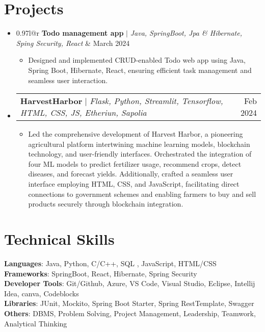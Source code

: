 \documentclass[letterpaper,11pt]{article}
\makeatletter
\newcommand{\resumeItem}[1]{
  \item\small{
    {#1 \vspace{-2pt}}
  }
}
\newcommand{\resumeSubSubheading}[2]{
    \item
    \begin{tabular*}{0.97\textwidth}{l@{\extracolsep{\fill}}r}
      \textit{\small#1} & \textit{\small #2} \\
    \end{tabular*}\vspace{-7pt}
}
\newcommand{\resumeProjectHeading}[2]{
    \item
    \begin{tabular*}{0.97\textwidth}{l@{\extracolsep{\fill}}r}
      \small#1 & #2 \\
    \end{tabular*}\vspace{-7pt}
}
\newcommand{\resumeSubHeadingListStart}{\begin{itemize}[leftmargin=0.15in, label={}]}
\newcommand{\resumeSubHeadingListEnd}{\end{itemize}}
\newcommand{\resumeItemListStart}{\begin{itemize}}
\newcommand{\resumeItemListEnd}{\end{itemize}\vspace{-5pt}}
\makeatother
\begin{document}

\section{Projects}
    \resumeSubHeadingListStart
            \resumeProjectHeading
          {\textbf{Todo management app} $|$ \emph{Java, SpringBoot, Jpa & Hibernate, Sping Security, React}}{March 2024 }
          \resumeItemListStart
            \resumeItem{Designed and implemented CRUD-enabled Todo web app using Java, Spring Boot, Hibernate, React, ensuring efficient task management and seamless user interaction.}
          \resumeItemListEnd
      \resumeProjectHeading
      {\textbf{HarvestHarbor} $|$ \emph{Flask, Python, Streamlit, Tensorflow, HTML, CSS, JS, Etheriun, Sapolia}}{Feb 2024}
          \resumeItemListStart
            \resumeItem{Led the comprehensive development of Harvest Harbor, a pioneering agricultural platform intertwining machine learning models, blockchain technology, and user-friendly interfaces. Orchestrated the integration of four ML models to predict fertilizer usage, recommend crops, detect diseases, and forecast yields. Additionally, crafted a seamless user interface employing HTML, CSS, and JavaScript, facilitating direct connections to government schemes and enabling farmers to buy and sell products securely through blockchain integration.}
          \resumeItemListEnd
    \resumeSubHeadingListEnd



%
\section{Technical Skills}
 \begin{itemize}[leftmargin=0.15in, label={}]
    \small{\item{
     \textbf{Languages}{: Java, Python, C/C++, SQL , JavaScript, HTML/CSS} \\
     \textbf{Frameworks}{: SpringBoot, React, Hibernate, Spring Security} \\
     \textbf{Developer Tools}{: Git/Github, Azure, VS Code, Visual Studio, Eclipse, Intellij Idea, canva, Codeblocks} \\
     \textbf{Libraries}{: JUnit, Mockito, Spring Boot Starter, Spring RestTemplate, Swagger}\\
     \textbf{Others}{: DBMS, Problem Solving, Project Management, Leadership, Teamwork, Analytical Thinking}
    }}
 \end{itemize}
\end{document}

